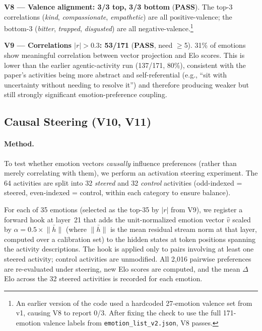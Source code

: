 \documentclass[11pt,a4paper]{article}
\newcommand{\pass}{\textcolor{passgreen}{\textbf{PASS}}}
\begin{document}
\textbf{V8 --- Valence alignment: 3/3 top, 3/3 bottom} (\pass).
The top-3 correlations (\emph{kind}, \emph{compassionate},
\emph{empathetic}) are all positive-valence; the bottom-3
(\emph{bitter}, \emph{trapped}, \emph{disgusted}) are all
negative-valence.\footnote{An earlier version of the code used a
hardcoded 27-emotion valence set from v1, causing V8 to report 0/3.
After fixing the check to use the full 171-emotion valence labels from
\texttt{emotion\_list\_v2.json}, V8 passes.}

\textbf{V9 --- Correlations $|r|>0.3$: 53/171} (\pass, need $\geq$5).
31\% of emotions show meaningful correlation between vector projection
and Elo scores.  This is lower than the earlier agentic-activity run
(137/171, 80\%), consistent with the paper's activities being more
abstract and self-referential (e.g., ``sit with uncertainty without
needing to resolve it'') and therefore producing weaker but still
strongly significant emotion-preference coupling.

\clearpage
\subsection{Causal Steering (V10, V11)}

\paragraph{Method.}
To test whether emotion vectors \emph{causally} influence preferences
(rather than merely correlating with them), we perform an activation
steering experiment.  The 64 activities are split into 32 \emph{steered}
and 32 \emph{control} activities (odd-indexed = steered, even-indexed =
control, within each category to ensure balance).

For each of 35 emotions (selected as the top-35 by $|r|$ from V9), we
register a forward hook at layer~21 that adds the unit-normalized
emotion vector $\hat{v}$ scaled by $\alpha = 0.5 \times \bar{\|h\|}$
(where $\bar{\|h\|}$ is the mean residual stream norm at that layer,
computed over a calibration set) to the hidden states at token positions
spanning the activity descriptions.  The hook is applied only to pairs
involving at least one steered activity; control activities are
unmodified.  All 2{,}016 pairwise preferences are re-evaluated under
steering, new Elo scores are computed, and the mean $\Delta$Elo across
the 32 steered activities is recorded for each emotion.
\end{document}
